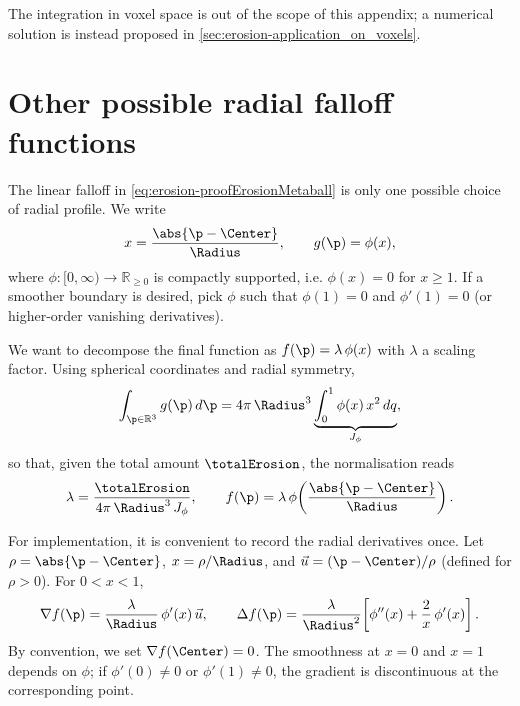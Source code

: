 The integration in voxel space is out of the scope of this appendix; a numerical solution is instead proposed in \cref{sec:erosion-application_on_voxels}.


\section{Other possible radial falloff functions}
\label{sec:erosion-appendix-other-falloffs}

The linear falloff in \cref{eq:erosion-proofErosionMetaball} is only one possible choice of radial profile. We write
\begin{equation}
    x = \frac{\abs{\p - \Center}}{\Radius}, \qquad
    g(\p) = \phi(x),
\end{equation}
where $\phi: [0,\infty) \to \mathbb{R}_{\ge 0}$ is compactly supported, i.e. $\phi(x) = 0$ for $x \ge 1$. If a smoother boundary is desired, pick $\phi$ such that $\phi(1) = 0$ and $\phi'(1) = 0$ (or higher-order vanishing derivatives).

We want to decompose the final function as $f(\p) = \lambda\,\phi(x)$ with $\lambda$ a scaling factor. Using spherical coordinates and radial symmetry,
\begin{equation}
    \int_{\p\in\mathbb{R}^3} g(\p)\,d\p
    = 4\pi\,\Radius^3 \underbrace{\int_{0}^{1} \phi(x)\,x^2\,dq}_{J_\phi},
\end{equation}
so that, given the total amount $\totalErosion$, the normalisation reads
\begin{align}
    \label{eq:metaball-general-J}
    \lambda = \frac{\totalErosion}{4\pi\,\Radius^3\,J_\phi},
    \qquad
    f(\p) = \lambda\,\phi\!\left(\frac{\abs{\p - \Center}}{\Radius}\right).
\end{align}

For implementation, it is convenient to record the radial derivatives once. Let $\rho=\abs{\p - \Center}$, $x=\rho/\Radius$, and $\vec{u}=(\p-\Center)/\rho$ (defined for $\rho>0$). For $0<x<1$,
\begin{equation}
    \nabla f(\p) = \frac{\lambda}{\Radius}\,\phi'(x)\,\vec{u},
    \qquad
    \Delta f(\p) = \frac{\lambda}{\Radius^2}\!\left[\phi''(x) + \frac{2}{x}\,\phi'(x)\right].
\end{equation}
By convention, we set $\nabla f(\Center)=0$. The smoothness at $x=0$ and $x=1$ depends on $\phi$; if $\phi'(0)\neq 0$ or $\phi'(1)\neq 0$, the gradient is discontinuous at the corresponding point.


